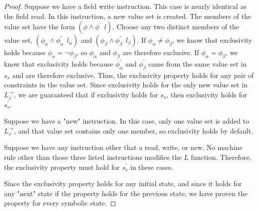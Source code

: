\begin{proof}
Suppose we have a field write instruction. This case is nearly identical as the field read. In this instruction, a new value set is created. The members of the value set have the form $(\phi\wedge \phi^\prime\ \ l)$. Choose any two distinct members of the value set, $(\phi_\alpha \wedge \phi_\alpha^\prime\ \ l_\alpha)$ and $(\phi_\beta \wedge \phi_\beta^\prime\ \ l_\beta)$. If $\phi_\alpha \ne \phi_\beta$, we know that exclusivity holds because $\phi_\alpha = \neg \phi_\beta$, so $\phi_\alpha$ and $\phi_\beta$ are therefore exclusive. If $\phi_\alpha = \phi_\beta$, we know that exclusivity holds because $\phi_\alpha^\prime$ and $\phi_\beta^\prime$ came from the same value set in $s_s$ and are therefore exclusive. Thus, the exclusivity property holds for any pair of constraints in the value set. Since exclusivity holds for the only new value set in $L_{s^\prime}^\rightarrow$, we are guaranteed that if exclusivity holds for $s_s$, then exclusivity holds for $s_s^\prime$.

Suppose we have a "new" instruction. In this case, only one value set is added to $L_{s^\prime}^\rightarrow$, and that value set contains only one member, so exclusivity holds by default.

Suppose we have any instruction other that a read, write, or new. No machine rule other than those three listed instructions modifies the $L$ function. Therefore, the exclusivity property must hold for $s_s^\prime$ in these cases.

Since the exclusivity property holds for any initial state, and since it holds for any "next" state if the property holds for the previous state, we have proven the property for every symbolic state.
\end{proof}

